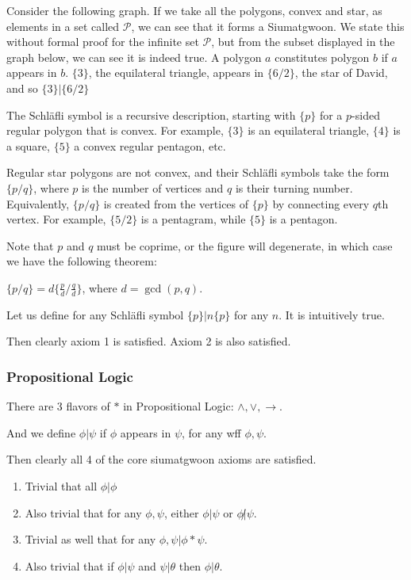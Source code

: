 Consider the following graph. If we take all the polygons, convex and star, as elements in a set called $\mathcal{P}$, we can see that it forms a Siumatgwoon. We state this without formal proof for the infinite set $\mathcal{P}$, but from the subset displayed in the graph below, we can see it is indeed true. A polygon $a$ constitutes polygon $b$ if $a$ appears in $b$. $\{3\}$, the equilateral triangle, appears in $\{6/2\}$, the star of David, and so $\{3\} |\{6/2\}$

The Schläfli symbol is a recursive description, starting with $\{p\}$ for a $p$-sided regular polygon that is convex. For example, $\{3\}$ is an equilateral triangle, $\{4\}$ is a square, $\{5\}$ a convex regular pentagon, etc.

Regular star polygons are not convex, and their Schläfli symbols take the form $\{p/q\}$, where $p$ is the number of vertices and $q$ is their turning number. Equivalently, $\{p/q\}$ is created from the vertices of $\{p\}$ by connecting every $q$th vertex. For example, $\{5/2\}$ is a pentagram, while $\{5\}$ is a pentagon.

Note that $p$ and $q$ must be coprime, or the figure will degenerate, in which case we have the following theorem:

$\{p/q\}=d\{ \frac{p}{d} / \frac{q}{d} \}$, where $d=\gcd(p,q)$.

Let us define for any Schläfli symbol $\{p\} | n\{p\}$ for any $n$. It is intuitively true.

Then clearly axiom 1 is satisfied. Axiom 2 is also satisfied.

\subsubsection{Propositional Logic}

There are 3 flavors of $*$ in Propositional Logic: $\wedge, \vee, \rightarrow$. 

And we define $\phi | \psi$ if $\phi$ appears in $\psi$, for any wff $\phi, \psi$.

Then clearly all 4 of the core siumatgwoon axioms are satisfied. 

\begin{enumerate}
\item Trivial that all $\phi | \phi$
\item Also trivial that for any $\phi, \psi$, either $\phi|\psi$ or $\phi\not|\psi$.
\item Trivial as well that for any $\phi,\psi | \phi * \psi$.
\item Also trivial that if $\phi | \psi$ and $\psi | \theta$ then $\phi | \theta$.
\end{enumerate}

